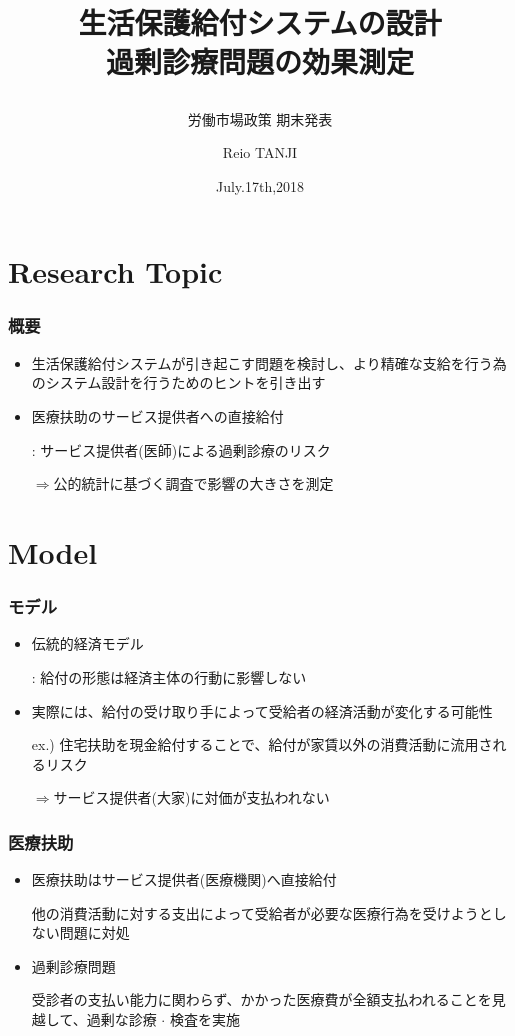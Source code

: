 \documentclass[dvipdfmx,14pt]{beamer}
\title{生活保護給付システムの設計 \\ 過剰診療問題の効果測定
\subtitle{労働市場政策 期末発表}}
\author{Reio TANJI}
\date{July.17th,2018}
\institute{Osaka University}
\begin{document}
\begin{frame}\frametitle{}
\titlepage
\end{frame}

\section{Research Topic}
\begin{frame}\frametitle{概要}

 \begin{itemize}
 
 \item 生活保護給付システムが引き起こす問題を検討し、より精確な支給を行う為のシステム設計を行うためのヒントを引き出す
 
 \item 医療扶助のサービス提供者への直接給付
 
 : サービス提供者(医師)による過剰診療のリスク
 
 $\Rightarrow$公的統計に基づく調査で影響の大きさを測定
 
 \end{itemize}

\end{frame}

\section{Model}
\begin{frame}\frametitle{モデル}

 \begin{itemize}
 
 \item 伝統的経済モデル
 
 : 給付の形態は経済主体の行動に影響しない
 
 \item 実際には、給付の受け取り手によって受給者の経済活動が変化する可能性
 
 ex.) 住宅扶助を現金給付することで、給付が家賃以外の消費活動に流用されるリスク
 
 $\Rightarrow$サービス提供者(大家)に対価が支払われない
 
 \end{itemize}

\end{frame}

\begin{frame}\frametitle{医療扶助}

 \begin{itemize}
 
 \item 医療扶助はサービス提供者(医療機関)へ直接給付
 
 他の消費活動に対する支出によって受給者が必要な医療行為を受けようとしない問題に対処
 
 \item 過剰診療問題
 
 受診者の支払い能力に関わらず、かかった医療費が全額支払われることを見越して、過剰な診療 $\cdot$ 検査を実施
 
 \end{itemize}

\end{frame}
\end{document}
